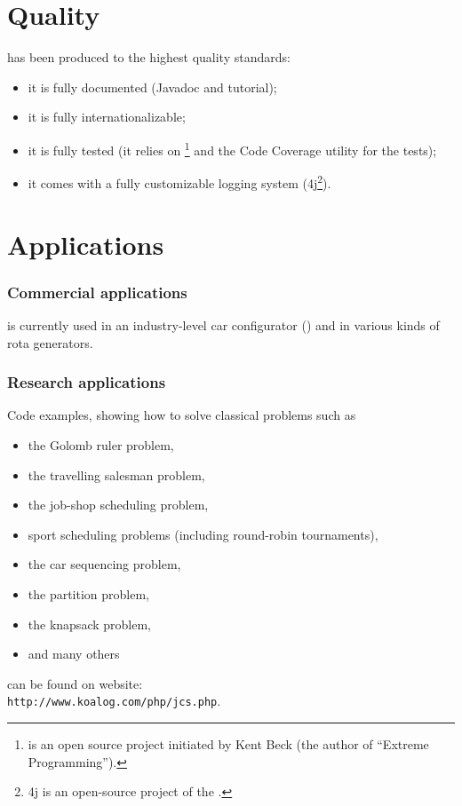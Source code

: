 \documentclass[twocolumn,a4paper,11pt]{article}
\begin{document}
\section*{\color{Blue}Quality}
{\jcs} has been produced to the highest quality standards:
\begin{itemize}
\item it is fully documented (Javadoc and tutorial);
\item it is fully internationalizable;
\item it is fully tested 
(it relies on {\junit}\footnote{{\junit} is an open source project initiated by Kent Beck (the author of ``Extreme Programming'').} 
and the {\koalog} Code Coverage utility for the tests);
\item it comes with a fully customizable logging system ({\log4j}\footnote{{\log4j} is an open-source project of the {\asf}.}).
\end{itemize}

\section*{\color{Blue}Applications}
\subsubsection*{Commercial applications}
{\jcs} is currently used in an industry-level car configurator ({\jcf}) and in
various kinds of rota generators.

\subsubsection*{Research applications}
Code examples, showing how to solve classical problems such as 
\begin{itemize}
\item the Golomb ruler problem,
\item the travelling salesman problem,
\item the job-shop scheduling problem,
\item sport scheduling problems (including round-robin tournaments),
\item the car sequencing problem,
\item the partition problem,
\item the knapsack problem,
\item and many others
\end{itemize}
can be found on {\jcs} website:\\
{\tt http://www.koalog.com/php/jcs.php}.
\end{document}
